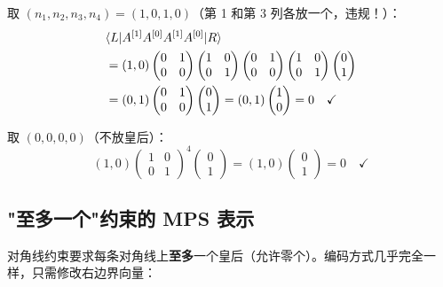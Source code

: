 \documentclass[12pt,a4paper]{ctexart}
\begin{document}
取 $(n_1, n_2, n_3, n_4) = (1, 0, 1, 0)$（第 1 和第 3 列各放一个，违规！）：
\begin{align}
&\langle L| A^{[1]} A^{[0]} A^{[1]} A^{[0]} |R\rangle \notag \\
&= (1,0) \begin{pmatrix}0&1\\0&0\end{pmatrix} \begin{pmatrix}1&0\\0&1\end{pmatrix} \begin{pmatrix}0&1\\0&0\end{pmatrix} \begin{pmatrix}1&0\\0&1\end{pmatrix} \begin{pmatrix}0\\1\end{pmatrix} \notag \\
&= (0,1) \begin{pmatrix}0&1\\0&0\end{pmatrix} \begin{pmatrix}0\\1\end{pmatrix} = (0,1) \begin{pmatrix}1\\0\end{pmatrix} = 0 \quad \checkmark
\end{align}

取 $(0,0,0,0)$（不放皇后）：
\[
(1,0) \begin{pmatrix}1&0\\0&1\end{pmatrix}^4 \begin{pmatrix}0\\1\end{pmatrix} = (1,0)\begin{pmatrix}0\\1\end{pmatrix} = 0 \quad \checkmark
\]

\subsection{"至多一个"约束的 MPS 表示}

对角线约束要求每条对角线上\textbf{至多}一个皇后（允许零个）。编码方式几乎完全一样，只需修改右边界向量：
\end{document}
